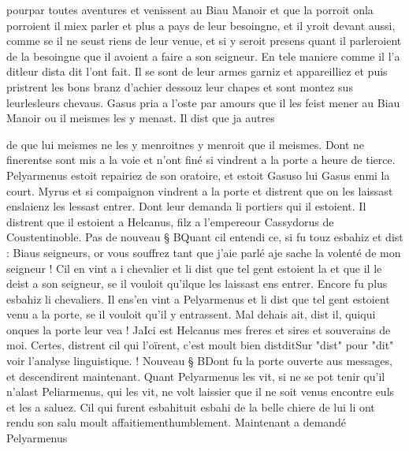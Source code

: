 \documentclass{article}
\begin{document}
\begin{pages}
                     pourpar toutes aventures et venissent au Biau
                     Manoir et 
                     que la porroit onla porroient il miex parler et plus a pays de leur besoingne, et il yroit devant aussi,
                  comme se il ne seust riens de leur venue, et si 
                     y seroit presens quant il parleroient 
                     de la besoingne que il avoient a faire a son
                     seigneur. En tele maniere comme il 
                  l’a ditleur dista dit l’ont fait. Il se sont de leur armes garniz et appareilliez et puis pristrent
               les bons branz d’achier dessouz leur chapes et sont montez sus 
                  leurlesleurs chevaus. Gasus pria a l’oste par amours que il les
                  feist mener au Biau Manoir ou il meismes
                  les y menast. Il dist que 
                     ja autres
                  
                     
                           de
                           que lui meismes ne les y menroitnes y menroit que il meismes. Dont 
                  ne finerentse sont mis a la voie et n'ont finé si vindrent a la porte a heure de tierce. Pelyarmenus estoit repairiez de son oratoire, et estoit 
                  Gasuso lui Gasus enmi la court. Myrus et si compaignon
               vindrent a la porte et distrent que 
                     on les laissast enslaienz les lessast entrer. Dont leur demanda li portiers qui il estoient. Il distrent 
                  que il estoient a Helcanus, filz a l’empereour Cassydorus  de Coustentinoble. \pend
            \pstart 
               Pas de nouveau § BQuant cil
               entendi ce, si fu touz esbahiz et dist : Biaus
                  seigneurs, or vous souffrez tant que 
                     j’aie parlé aje sache la volenté de
                  mon seigneur ! Cil en
               vint a i chevalier et li dist que tel
                  gent estoient la et que il le deist a son seigneur, se il vouloit 
                        qu'ilque les laissast 
                        ens entrer. Encore fu plus esbahiz li chevaliers. Il 
                  ens'en vint a Pelyarmenus et li dist que tel gent estoient venu a la porte, 
                     se il vouloit qu’il 
                           y entrassent. Mal dehais ait, dist il, 
                     quiqui onques la porte leur vea ! 
                     JaIci est Helcanus mes freres et sires et
                  souverains de moi.
               Certes, distrent cil qui l’oïrent, c’est 
                     moult bien 
                     distditSur "dist" pour "dit" voir l'analyse
                     linguistique. !
               Nouveau § BDont fu la porte ouverte aus messages, et descendirent maintenant. 
                  Quant Pelyarmenus les
                     vit, si ne se pot tenir qu’il n’alast Peliarmenus, qui les vit, ne volt laissier que il ne soit
                     venus encontre euls et les a saluez. Cil qui furent 
                  esbahituit esbahi de la belle chiere de lui li ont rendu son salu moult 
                  affaitiementhumblement. Maintenant a demandé Pelyarmenus
               

\end{pages}
\end{document}
